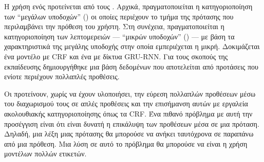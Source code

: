 Η χρήση ενός  προτείνεται από τους .
Αρχικά, πραγματοποιείται η κατηγοριοποίηση των \enquote{μεγάλων υποδοχών} () οι οποίες περιέχουν το τμήμα της πρότασης που περιλαμβάνει την πρόθεση του χρήστη.
Στη συνέχεια, πραγματοποιείται η κατηγοριοποίηση των λεπτομερειών --- \enquote{μικρών υποδοχών} () --- με βάση τα χαρακτηριστικά της μεγάλης υποδοχής στην οποία εμπεριέχεται η μικρή.
Δοκιμάζεται ένα μοντέλο με CRF και ένα με δίκτυα GRU-RNN.
Για τους σκοπούς της εκπαίδευσης δημιουργήθηκε μια βάση δεδομένων που αποτελείται από προτάσεις που ενίοτε περιέχουν πολλαπλές προθέσεις.

Οι \citet{xia2018zero} προτείνουν, χωρίς να έχουν υλοποιήσει, την εύρεση πολλαπλών προθέσεων μέσω του διαχωρισμού τους σε απλές προθέσεις και την επισήμανση αυτών με εργαλεία ακολουθιακής κατηγοριοποίησης όπως τα CRF.
Ένα πιθανό πρόβλημα με αυτή την προσέγγιση είναι ότι είναι δυνατή η επικάλυψη των προθέσεων μέσα σε μια πρόταση.
Δηλαδή, μια λέξη μιας πρότασης θα μπορούσε να ανήκει ταυτόχρονα σε παραπάνω από μια πρόθεση.
Μια λύση σε αυτό το πρόβλημα θα μπορούσε να είναι η χρήση μοντέλων πολλών ετικετών.

